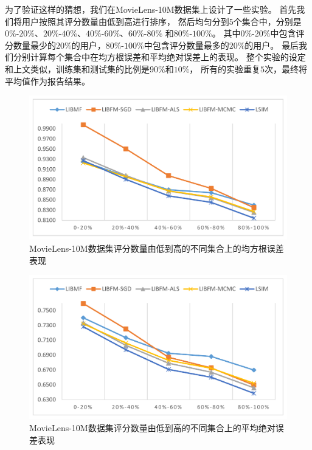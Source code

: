 为了验证这样的猜想，我们在MovieLens-10M数据集上设计了一些实验。
首先我们将用户按照其评分数量由低到高进行排序，
然后均匀分到$5$个集合中，分别是$0\%$-$20\%$、$20\%$-$40\%$、$40\%$-$60\%$、$60\%$-$80\%$
和$80\%$-$100\%$。
其中$0\%$-$20\%$中包含评分数量最少的$20\%$的用户，$80\%$-$100\%$中包含评分数量最多的$20\%$的用户。
最后我们分别计算每个集合中在均方根误差和平均绝对误差上的表现。
整个实验的设定和上文类似，训练集和测试集的比例是$90\%$和$10\%$，
所有的实验重复$5$次，最终将平均值作为报告结果。

\begin{figure}[htbp]
    \centering
    \includegraphics[scale=0.36]{images/rank_rmse.pdf}
    \caption{MovieLens-10M数据集评分数量由低到高的不同集合上的均方根误差表现}
    \label{fig:rank_rmse}
\end{figure}

\begin{figure}[htbp]
    \centering
    \includegraphics[scale=0.36]{images/rank_mae.pdf}
    \caption{MovieLens-10M数据集评分数量由低到高的不同集合上的平均绝对误差表现}
    \label{fig:rank_mae}
\end{figure}

